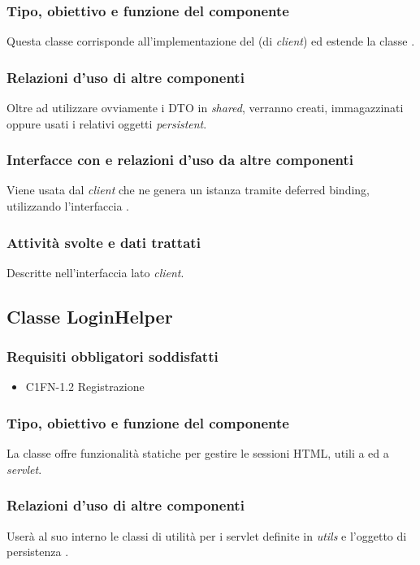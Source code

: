 \subsubsection*{Tipo, obiettivo e funzione del componente}
Questa classe corrisponde all'implementazione del  (di
\emph{client}) ed estende la classe .

\subsubsection*{Relazioni d'uso di altre componenti}
Oltre ad utilizzare ovviamente i DTO in \emph{shared}, verranno creati,
immagazzinati oppure usati i relativi oggetti \emph{persistent}.

\subsubsection*{Interfacce con e relazioni d'uso da altre componenti}
Viene usata dal \emph{client} che ne genera un istanza tramite deferred binding,
utilizzando l'interfaccia .

\subsubsection*{Attivit\`a svolte e dati trattati}
Descritte nell'interfaccia lato \emph{client}.

\subsection{Classe LoginHelper}
\subsubsection*{Requisiti obbligatori soddisfatti}
\begin{itemize}
	\item C1FN-1.2 Registrazione
\end{itemize}
\subsubsection*{Tipo, obiettivo e funzione del componente}
La classe  offre funzionalit\`a statiche
per gestire le sessioni HTML, utili a  ed a
\emph{servlet}.

\subsubsection*{Relazioni d'uso di altre componenti}
User\`a al suo interno le classi di utilit\`a per i servlet definite in
\emph{utils} e l'oggetto di persistenza .


